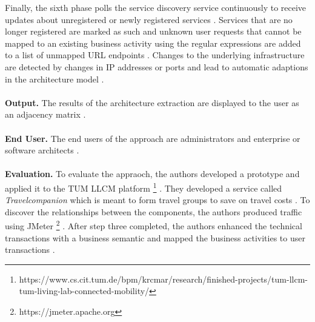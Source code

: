 Finally, the sixth phase polls the service discovery service continuously to receive updates about unregistered or newly registered services \cite{Kleehaus2018}.
Services that are no longer registered are marked as such and unknown user requests that cannot be mapped to an existing business activity using the regular expressions are added to a list of unmapped URL endpoints \cite{Kleehaus2018}.
Changes to the underlying infrastructure are detected by changes in IP addresses or ports and lead to automatic adaptions in the architecture model \cite{Kleehaus2018}.
\\ \\
\textbf{Output.}
The results of the architecture extraction are displayed to the user as an adjacency matrix \cite{Kleehaus2018}.
\\ \\
\textbf{End User.}
The end users of the approach are administrators and enterprise or software architects \cite{Kleehaus2018}.
\\ \\
\textbf{Evaluation.}
To evaluate the appraoch, the authors developed a prototype and applied it to the TUM LLCM platform \footnote{https://www.cs.cit.tum.de/bpm/krcmar/research/finished-projects/tum-llcm-tum-living-lab-connected-mobility/} \cite{Kleehaus2018}.
They developed a service called \textit{Travelcompanion} which is meant to form travel groups to save on travel costs \cite{Kleehaus2018}.
To discover the relationships between the components, the authors produced traffic using JMeter \footnote{https://jmeter.apache.org} \cite{Kleehaus2018}.
After step three completed, the authors enhanced the technical transactions with a business semantic and mapped the business activities to user transactions \cite{Kleehaus2018}.
